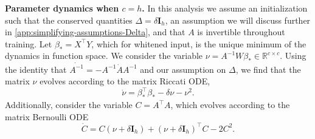 \documentclass{article}
\theoremstyle{plain}
\theoremstyle{definition}
\theoremstyle{remark}
\begin{document}
\textbf{Parameter dynamics when $c = h$.}
%
In this analysis we assume an initialization such that the conserved quantities $\Delta = \delta \mathbf{I}_h$, an assumption we will discuss further in \cref{app:simplifying-assumptions-Delta}, and that $A$ is invertible throughout training.
%
Let $\beta_* = X^\intercal Y$, which for whitened input, is the unique minimum of the dynamics in function space.
%
%
We consider the variable $\nu = A^{-1} W \beta_* \in \mathbb{R}^{c \times c}$.
%
Using the identity that $\dot{A^{-1}} = - A^{-1} \dot{A} A^{-1}$ and our assumption on $\Delta$, we find that the matrix $\nu$ evolves according to the matrix Riccati ODE,
\begin{equation}
    \dot{\nu} = \beta_*^\intercal\beta_* - \delta \nu - \nu^2.
\end{equation}
Additionally, consider the variable $C = A^\intercal A$, which evolves according to the matrix Bernoulli ODE
\begin{equation}
    \dot{C} = C (\nu + \delta \mathbf{I}_h) +(\nu + \delta \mathbf{I}_h)^\intercal C  - 2C^2.
\end{equation}
\end{document}
